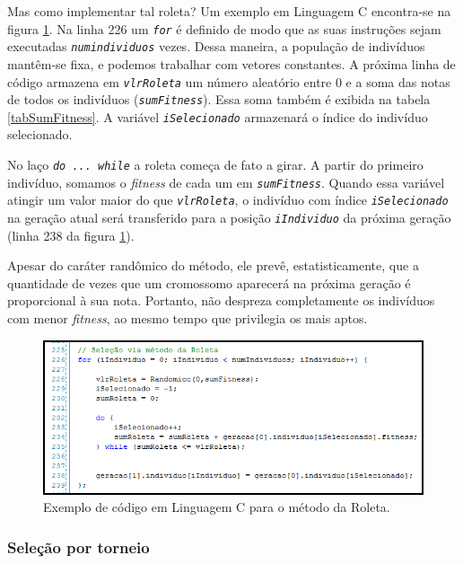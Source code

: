 	Mas como implementar tal roleta? Um exemplo em Linguagem C encontra-se na figura \ref{figCodRoleta}. Na linha 226 um \textit{\texttt{for}} é definido de modo que as suas instruções sejam executadas \textit{\texttt{numindividuos}} vezes. Dessa maneira, a população de indivíduos mantêm-se fixa, e podemos trabalhar com vetores constantes. A próxima linha de código armazena em \textit{\texttt{vlrRoleta}} um número aleatório entre 0 e a soma das notas de todos os indivíduos (\textit{\texttt{sumFitness}}). Essa soma também é exibida na tabela \ref{tabSumFitness}. A variável \textit{\texttt{iSelecionado}} armazenará o índice do indivíduo selecionado.
	
	No laço \textit{\texttt{do ... while}} a roleta começa de fato a girar. A partir do primeiro indivíduo, somamos o \textit{fitness} de cada um em \textit{\texttt{sumFitness}}. Quando essa variável atingir um valor maior do que \textit{\texttt{vlrRoleta}}, o indivíduo com índice \textit{\texttt{iSelecionado}} na geração atual será transferido para a posição \textit{\texttt{iIndividuo}} da próxima geração (linha 238 da figura \ref{figCodRoleta}). 
	
	Apesar do caráter randômico do método, ele prevê, estatisticamente, que a quantidade de vezes que um cromossomo aparecerá na próxima geração é proporcional à sua nota. Portanto, não despreza completamente os indivíduos com menor \textit{fitness}, ao mesmo tempo que privilegia os mais aptos.

	\begin{figure}[htp]
		\begin{center}
			\includegraphics[width=13cm]{figs/ga/CodigoRoleta.png}
		\end{center}
		\caption{\label{figCodRoleta}Exemplo de código em Linguagem C para o método da Roleta.}
	\end{figure}
	
	\subsubsection{Seleção por torneio}
	
